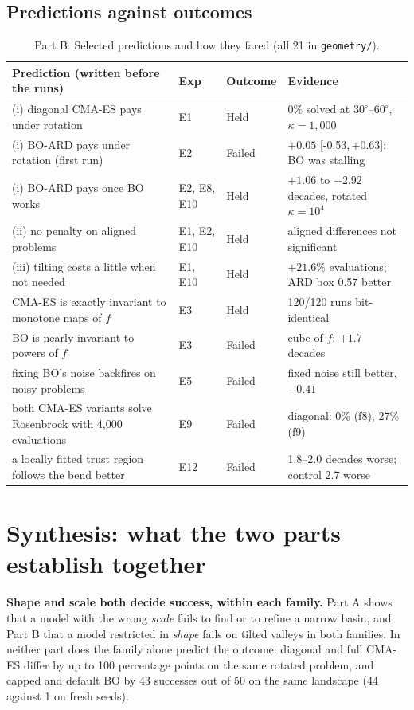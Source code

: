 \documentclass[10pt,a4paper]{article}
\newcommand{\ci}[2]{[#1,\,#2]}
\begin{document}
\subsection{Predictions against outcomes}
\begin{table}[H]
\centering\footnotesize
\begin{tabular}{p{6.0cm}lp{1.9cm}p{6.0cm}}
\toprule
Prediction (written before the runs) & Exp & Outcome & Evidence \\
\midrule
(i) diagonal CMA-ES pays under rotation & E1 & Held & 0\% solved at $30^\circ$--$60^\circ$, $\kappa=1{,}000$ \\
(i) BO-ARD pays under rotation (first run) & E2 & Failed & $+0.05$ \ci{-0.53}{+0.63}: BO was stalling \\
(i) BO-ARD pays once BO works & E2, E8, E10 & Held & $+1.06$ to $+2.92$ decades, rotated $\kappa=10^4$ \\
(ii) no penalty on aligned problems & E1, E2, E10 & Held & aligned differences not significant \\
(iii) tilting costs a little when not needed & E1, E10 & Held & $+21.6\%$ evaluations; ARD box 0.57 better \\
CMA-ES is exactly invariant to monotone maps of $f$ & E3 & Held & 120/120 runs bit-identical \\
BO is nearly invariant to powers of $f$ & E3 & Failed & cube of $f$: $+1.7$ decades \\
fixing BO's noise backfires on noisy problems & E5 & Failed & fixed noise still better, $-0.41$ \\
both CMA-ES variants solve Rosenbrock with 4,000 evaluations & E9 & Failed & diagonal: 0\% (f8), 27\% (f9) \\
a locally fitted trust region follows the bend better & E12 & Failed & 1.8--2.0 decades worse; control 2.7 worse \\
\bottomrule
\end{tabular}
\caption{Part B. Selected predictions and how they fared (all 21 in \texttt{geometry/}).}
\end{table}

\section{Synthesis: what the two parts establish together}\label{sec:synth}
\textbf{Shape and scale both decide success, within each family.} Part A shows that a model with the wrong
\emph{scale} fails to find or to refine a narrow basin, and Part B that a model restricted in \emph{shape} fails on
tilted valleys in both families. In neither part does the family alone predict the outcome: diagonal and full
CMA-ES differ by up to 100 percentage points on the same rotated problem, and capped and default BO by 43 successes out of 50
on the same landscape (44 against 1 on fresh seeds).
\end{document}
